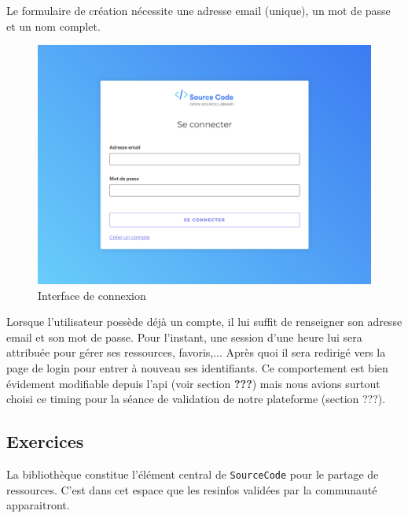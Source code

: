 Le formulaire de création nécessite une adresse email (unique), un mot de passe et un nom complet.


\begin{figure}[H]
    \includegraphics[width=\textwidth,height=0.35\textheight,keepaspectratio]{images/client/login.png}
    \centering
    \caption[SourceCode : interface de connexion]{Interface de connexion}
\end{figure}

Lorsque l'utilisateur possède déjà un compte, il lui suffit de renseigner son adresse email et son mot de passe. Pour l'instant, une session d'une heure lui sera attribuée pour gérer ses ressources, favoris,... Après quoi il sera redirigé vers la page de login pour entrer à nouveau ses identifiants. Ce comportement est bien évidement modifiable depuis l'api (voir section \textbf{???}) mais nous avions surtout choisi ce timing pour la séance de validation de notre plateforme (section ???).\\


\subsection{Exercices}

La bibliothèque constitue l'élément central de \texttt{SourceCode} pour le partage de ressources. C'est dans cet espace que les \glspl{resinfo} validées par la communauté apparaitront.\\

